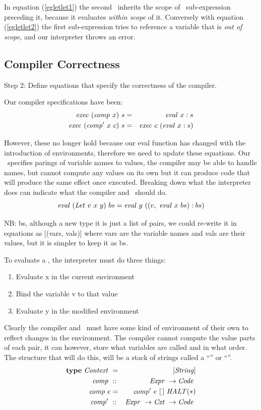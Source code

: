 \documentclass {article}
\begin{document}
In equation (\ref{egletlet1})
the second \add\ inherits
the scope of \leet\ sub-expression 
preceding it, 
because it evaluates
\emph{within scope} of it.
Conversely with equation (\ref{egletlet2})
the first sub-expression tries to reference
a variable that is \emph{out of scope},
and our interpreter throws an error.

\subsection{Compiler Correctness}

Step 2: Define equations that specify the
	correctness of the compiler.

Our compiler specifications have been:
\begin{eqnarray*}
\mathit{exec\ }  (\mathit{comp\ }  x)\  s &=& \mathit{eval\ }   x:s \\
\mathit{exec\ }  (\mathit{comp'\ }   x\  c)\ s &=& \mathit{exec\ }  c\  (\mathit{eval\ } x:s)
\end{eqnarray*}

However, these no longer hold
because our eval function has changed
with the introduction of environments,
therefore we need to update these equations.
\linebreak
Our \env\ specifies parings of 
variable names to values,
the compiler may be able to handle names,
but cannot compute any 
values on its own
but it can produce code that will
produce the same effect once executed.
Breaking down what the interpreter
does can indicate what the 
compiler and \vm\ should do.
\[\evalf (\Let v\ x\ y)\ bs 
		= \evalf  y\ ((v,\ \evalf  x\ bs):bs) \]

NB: bs, although a new type it is just a list
of pairs, we could re-write it in equations as
[(vars, vals)] where vars are the variable names
and vals are their values,
but it is simpler to keep it as bs.

To evaluate a \leet, the interpreter
must do three things:
\begin{enumerate}
	\item Evaluate x in the current environment
	\item Bind the variable v to that value
	\item Evaluate y in the modified environment
\end{enumerate}

Clearly the compiler and \vm\ must have some kind of
environment of their own to
reflect changes in the environment.
The compiler cannot compute the value
parts of each pair,
it can however, 
store what variables are called and in what order.
The structure that will do this, will be a 
stack of strings called a ``\Contextt'' or ``\Cxtt''.
\begin{eqnarray*}
	\textbf{type}\  \mathit{Context\ } &=& [\mathit{String}] \\
	\mathit{comp\ } &::& \mathit{Expr\ } \rightarrow \mathit{Code\ } \\
	\mathit{comp\ } e &=& \mathit{comp'\ }  e\ [\,]\ \mathit{HALT} (*)\\
	\mathit{comp'\ } &::& \mathit{Expr\ } \rightarrow \mathit{Cxt\ } \rightarrow \mathit{Code\ }
\end{eqnarray*}
\end{document}
